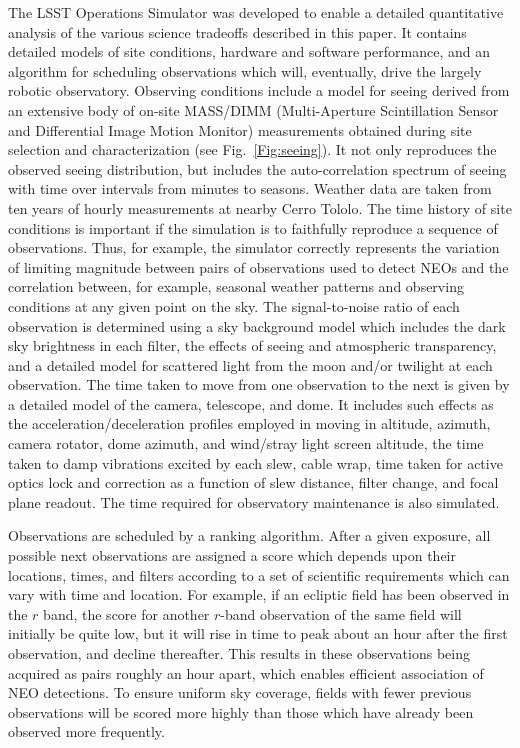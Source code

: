 \documentclass{emulateapj}
\begin{document}
The LSST Operations Simulator was developed to enable a 
detailed quantitative analysis of the various science tradeoffs described in 
this paper. It contains detailed models of site conditions, hardware and
software performance, and an algorithm for scheduling observations which will, 
eventually, drive the largely robotic observatory. 
Observing conditions include a model for seeing derived from an extensive body
of on-site MASS/DIMM (Multi-Aperture Scintillation Sensor and Differential
Image Motion Monitor) measurements obtained during site selection and
characterization (see Fig.~\ref{Fig:seeing}). It not only reproduces the 
observed seeing distribution, but includes 
the auto-correlation spectrum of seeing with time over intervals from minutes 
to seasons. Weather data are taken from ten years of hourly measurements at
nearby Cerro Tololo. The time history of site conditions is important if the 
simulation is to faithfully reproduce a sequence of observations. Thus, for
example, the simulator correctly represents the variation of limiting
magnitude between pairs of observations used to detect NEOs and the
correlation between, for example, seasonal weather patterns and observing
conditions at any given point on the sky. The signal-to-noise ratio of each 
observation is determined using a sky background model which includes the dark
sky brightness in each filter, the effects of seeing and atmospheric
transparency, and a detailed model for scattered light from the moon and/or 
twilight at each observation. The time taken to move from one observation to
the next is given by a detailed model of the camera, telescope, and dome. It 
includes such effects as the acceleration/deceleration profiles employed in 
moving in altitude, azimuth, camera rotator, dome azimuth, and wind/stray
light screen altitude, the time taken to damp vibrations excited by each slew, 
cable wrap, time taken for active optics lock and correction as a function of 
slew distance, filter change, and focal plane readout. The time required for
observatory maintenance is also simulated. 

Observations are scheduled by a ranking algorithm. After a given exposure, all 
possible next observations are assigned a score which depends upon their locations, times,
and filters according to a set of scientific requirements which can vary with 
time and location. For example, if an ecliptic field has been observed in the
$r$ band, the score for another $r$-band observation of the same field will 
initially be quite low, but it will rise in time to peak about an hour after
the first observation, and decline thereafter. This results in these
observations being acquired as pairs roughly an hour apart, which enables
efficient association of NEO detections. To ensure uniform 
sky coverage, fields with fewer previous observations will be scored more
highly than those which have already been observed more frequently.
 
\end{document}
